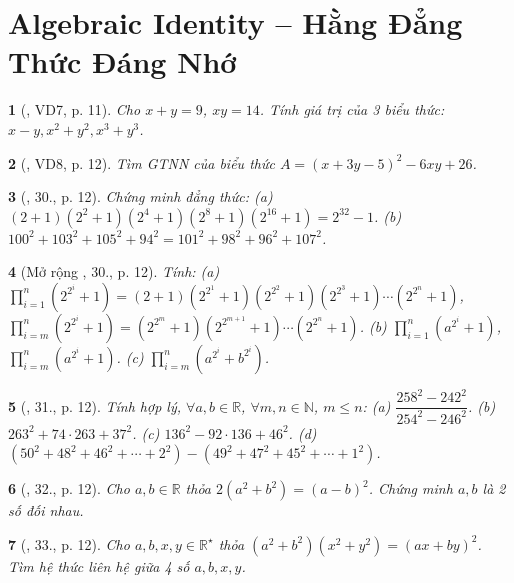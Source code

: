 \documentclass{article}
\newtheorem{baitoan}{}
\begin{document}
\section{Algebraic Identity -- Hằng Đẳng Thức Đáng Nhớ}

\begin{baitoan}[\cite{Tuyen_Toan_8}, VD7, p. 11]
	Cho $x + y = 9$, $xy = 14$. Tính giá trị của 3 biểu thức: $x - y,x^2 + y^2,x^3 + y^3$.
\end{baitoan}

\begin{baitoan}[\cite{Tuyen_Toan_8}, VD8, p. 12]
	Tìm {\rm GTNN} của biểu thức $A = (x + 3y - 5)^2 - 6xy + 26$.
\end{baitoan}

\begin{baitoan}[\cite{Tuyen_Toan_8}, 30., p. 12]
	Chứng minh đẳng thức: (a) $(2 + 1)(2^2 + 1)(2^4 + 1)(2^8 + 1)(2^{16} + 1) = 2^{32} - 1$. (b) $100^2 + 103^2 + 105^2 + 94^2 = 101^2 + 98^2 + 96^2 + 107^2$.
\end{baitoan}

\begin{baitoan}[Mở rộng \cite{Tuyen_Toan_8}, 30., p. 12]
	Tính: (a) $\prod_{i=1}^n (2^{2^i} + 1) = (2 + 1)(2^{2^1} + 1)(2^{2^2} + 1)(2^{2^3} + 1)\cdots(2^{2^n} + 1)$, $\prod_{i=m}^n (2^{2^i} + 1) = (2^{2^m} + 1)(2^{2^{m+1}} + 1)\cdots(2^{2^n} + 1)$. (b) $\prod_{i=1}^n (a^{2^i} + 1)$, $\prod_{i=m}^n (a^{2^i} + 1)$. (c) $\prod_{i=m}^n (a^{2^i} + b^{2^i})$.
\end{baitoan}

\begin{baitoan}[\cite{Tuyen_Toan_8}, 31., p. 12]
	Tính hợp lý, $\forall a,b\in\mathbb{R}$, $\forall m,n\in\mathbb{N}$, $m\le n$: (a) $\dfrac{258^2 - 242^2}{254^2 - 246^2}$. (b) $263^2 + 74\cdot263 + 37^2$. (c) $136^2 - 92\cdot136 + 46^2$. (d) $(50^2 + 48^2 + 46^2 + \cdots + 2^2) - (49^2 + 47^2 + 45^2 + \cdots + 1^2)$.
\end{baitoan}

\begin{baitoan}[\cite{Tuyen_Toan_8}, 32., p. 12]
	Cho $a,b\in\mathbb{R}$ thỏa $2(a^2 + b^2) = (a - b)^2$. Chứng minh $a,b$ là 2 số đối nhau.
\end{baitoan}

\begin{baitoan}[\cite{Tuyen_Toan_8}, 33., p. 12]
	Cho $a,b,x,y\in\mathbb{R}^\star$ thỏa $(a^2 + b^2)(x^2 + y^2) = (ax + by)^2$. Tìm hệ thức liên hệ giữa 4 số $a,b,x,y$.
\end{baitoan}
\end{document}
